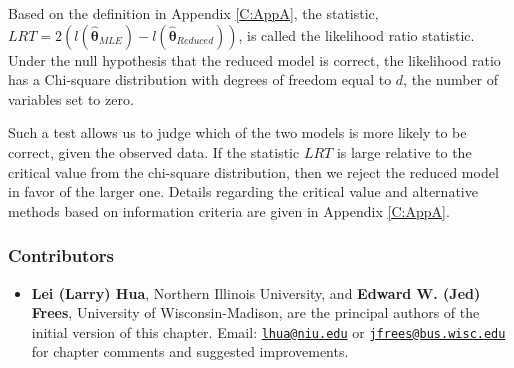 \documentclass[]{book}
\providecommand{\tightlist}{%
  \setlength{\itemsep}{0pt}\setlength{\parskip}{0pt}}
\theoremstyle{definition}
\theoremstyle{definition}
\theoremstyle{definition}
\theoremstyle{remark}
\begin{document}
Based on the definition in Appendix \ref{C:AppA}, the statistic,
\(LRT= 2 \left( l(\hat{\boldsymbol{\theta}}_{MLE}) - l(\hat{\boldsymbol{\theta}}_{Reduced}) \right)\),
is called the likelihood ratio statistic. Under the null hypothesis that
the reduced model is correct, the likelihood ratio has a Chi-square
distribution with degrees of freedom equal to \(d\), the number of
variables set to zero.

Such a test allows us to judge which of the two models is more likely to
be correct, given the observed data. If the statistic \(LRT\) is large
relative to the critical value from the chi-square distribution, then we
reject the reduced model in favor of the larger one. Details regarding
the critical value and alternative methods based on information criteria
are given in Appendix \ref{C:AppA}.

\subsubsection*{Contributors}\label{contributors-9}

\begin{itemize}
\tightlist
\item
  \textbf{Lei (Larry) Hua}, Northern Illinois University, and
  \textbf{Edward W. (Jed) Frees}, University of Wisconsin-Madison, are
  the principal authors of the initial version of this chapter. Email:
  \href{mailto:lhua@niu.edu}{\nolinkurl{lhua@niu.edu}} or
  \href{mailto:jfrees@bus.wisc.edu}{\nolinkurl{jfrees@bus.wisc.edu}} for
  chapter comments and suggested improvements.
\end{itemize}


\end{document}

